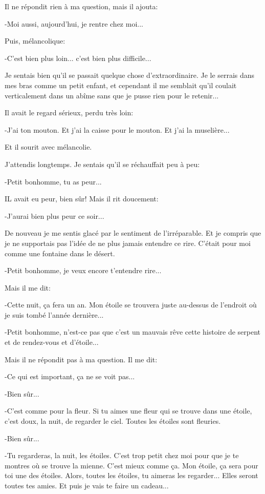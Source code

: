 \documentclass{report}
\begin{document}
Il ne répondit rien à ma question, mais il ajouta:

-Moi aussi, aujourd'hui, je rentre chez moi...

Puis, mélancolique:

-C'est bien plus loin... c'est bien plus difficile...

Je sentais bien qu'il se passait quelque chose d'extraordinaire. Je le serrais dans mes bras comme un petit enfant, et cependant il me semblait qu'il coulait verticalement dans un abîme sans que je pusse rien pour le retenir...

Il avait le regard sérieux, perdu très loin:

-J'ai ton mouton. Et j'ai la caisse pour le mouton. Et j'ai la muselière...

Et il sourit avec mélancolie.

J'attendis longtemps. Je sentais qu'il se réchauffait peu à peu:

-Petit bonhomme, tu as peur...

IL avait eu peur, bien sûr! Mais il rit doucement:

-J'aurai bien plus peur ce soir...

De nouveau je me sentis glacé par le sentiment de l'irréparable. Et je compris que je ne supportais pas l'idée de ne plus jamais entendre ce rire. C'était pour moi comme une fontaine dans le désert.

-Petit bonhomme, je veux encore t'entendre rire...

Mais il me dit:

-Cette nuit, ça fera un an. Mon étoile se trouvera juste au-dessus de l'endroit où je suis tombé l'année dernière...

-Petit bonhomme, n'est-ce pas que c'est un mauvais rêve cette histoire de serpent et de rendez-vous et d'étoile...

Mais il ne répondit pas à ma question. Il me dit:

-Ce qui est important, ça ne se voit pas...

-Bien sûr...

-C'est comme pour la fleur. Si tu aimes une fleur qui se trouve dans une étoile, c'est doux, la nuit, de regarder le ciel. Toutes les étoiles sont fleuries.

-Bien sûr...

-Tu regarderas, la nuit, les étoiles. C'est trop petit chez moi pour que je te montres où se trouve la mienne. C'est mieux comme ça. Mon étoile, ça sera pour toi une des étoiles. Alors, toutes les étoiles, tu aimeras les regarder... Elles seront toutes tes amies. Et puis je vais te faire un cadeau...
\end{document}
